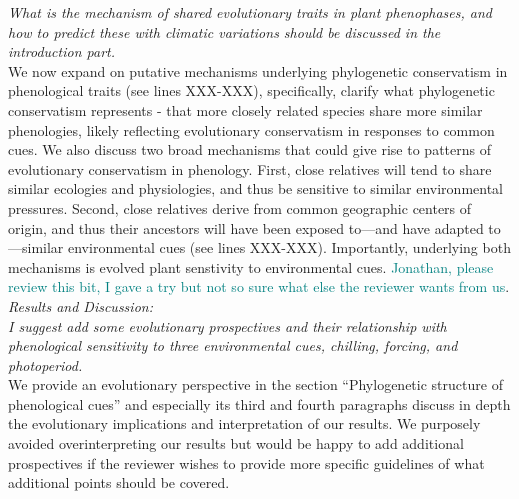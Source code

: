 \documentclass[11pt]{article}
\begin{document}
\emph{What is the mechanism of shared evolutionary traits in plant phenophases, and how to predict these with climatic variations should be discussed in the introduction part.}\\
We now expand on putative mechanisms underlying phylogenetic conservatism in phenological traits (see lines XXX-XXX), specifically, clarify what phylogenetic conservatism represents -  that more closely related species share more similar phenologies, likely reflecting evolutionary conservatism in responses to common cues. We also discuss two broad mechanisms that could give rise to patterns of evolutionary conservatism in phenology. First, close relatives will tend to share similar ecologies and physiologies, and thus be sensitive to similar environmental pressures. Second, close relatives derive from common geographic centers of origin, and thus their ancestors will have been exposed to---and have adapted to---similar environmental cues (see lines XXX-XXX). Importantly, underlying both mechanisms is evolved plant senstivity to environmental cues.
\textcolor{teal}{Jonathan, please review this bit, I gave a try but not so sure what else the reviewer wants from us}.\\


\emph{Results and Discussion:}\\
\emph{I suggest add some evolutionary prospectives and their relationship with phenological sensitivity to three environmental cues, chilling, forcing, and photoperiod.}\\
We provide an evolutionary perspective in the section ``Phylogenetic structure of phenological cues'' and especially its third and fourth paragraphs discuss in depth the evolutionary implications and interpretation of our results. We purposely avoided overinterpreting our results but would be happy to add additional prospectives if the reviewer wishes to provide more specific guidelines of what additional points should be covered.\\
\end{document}
